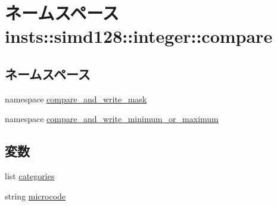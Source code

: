 \hypertarget{namespaceinsts_1_1simd128_1_1integer_1_1compare}{
\section{ネームスペース insts::simd128::integer::compare}
\label{namespaceinsts_1_1simd128_1_1integer_1_1compare}
}
\subsection*{ネームスペース}
\begin{DoxyCompactItemize}
\item 
namespace \hyperlink{namespaceinsts_1_1simd128_1_1integer_1_1compare_1_1compare__and__write__mask}{compare\_\-and\_\-write\_\-mask}
\item 
namespace \hyperlink{namespaceinsts_1_1simd128_1_1integer_1_1compare_1_1compare__and__write__minimum__or__maximum}{compare\_\-and\_\-write\_\-minimum\_\-or\_\-maximum}
\end{DoxyCompactItemize}
\subsection*{変数}
\begin{DoxyCompactItemize}
\item 
list \hyperlink{namespaceinsts_1_1simd128_1_1integer_1_1compare_a273cf0f1630af14c1582f05e53354a55}{categories}
\item 
string \hyperlink{namespaceinsts_1_1simd128_1_1integer_1_1compare_a770f11a173e99389a8802f0107ed8f52}{microcode}
\end{DoxyCompactItemize}


